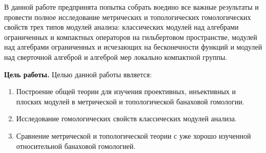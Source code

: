В данной работе предпринята попытка собрать воедино все важные результаты и
провести полное исследование метрических и топологических гомологических свойств
трех типов модулей анализа: классических модулей над алгебрами ограниченных и
компактных операторов  на гильбертовом пространстве, модулей над алгебрами
ограниченных и исчезающих на бесконечности функций и модулей над сверточной
алгеброй и алгеброй мер локально компактной группы.

\textbf{Цель работы.} Целью данной работы является:
\begin{enumerate}
    \item Построение общей теории для изучения проективных, инъективных и
          плоских модулей в метрической и топологической банаховой гомологии.
    \item Исследование гомологических свойств классических модулей анализа.
    \item Сравнение метрической и топологической теории с уже хорошо изученной
          относительной банаховой гомологией.
\end{enumerate}

